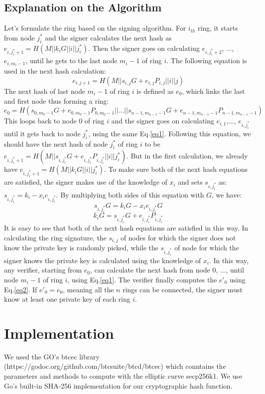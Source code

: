 \documentclass{llncs}
\begin{document}
\subsection{Explanation on the Algorithm}
Let's formulate the ring based on the signing algorithm. For $i_{th}$ ring, it starts from node $j^*_i$ and the signer calculates the next hash as $e_{i,j^*_i+1}=H(M||k_iG||i||j^*_i)$. Then the signer goes on calculating $e_{i,j^*_i+2}$, ..., $e_{i,m_i-1}$,  until he gets to the last node $m_i-1$ of ring $i$. The following equation is used in the next hash calculation:
\begin{equation}
\label{eq1}
e_{i,j+1}=H(M||s_{i,j}G+e_{i,j}P_{i,j}||i||j) 
\end{equation}
The next hash of last node $m_i-1$ of ring $i$ is defined as $e_0$, which links the last and first node thus forming a ring:
\begin{equation}
\label{eq2}
e_0=H(s_{0,m_0-1}G+e_{0,m_0-1}P_{0,m_0-1}||...||s_{n-1,m_{n-1}-1}G+e_{n-1,m_{n-1}-1}P_{n-1,m_{n-1}-1})
\end{equation}
This loops back to node $0$ of ring $i$ and the signer goes on calculating $e_{i,1}$,..., $e_{i,j^*_i}$ until it gets back to node $j^*_i$, using the same Eq.\ref{eq1}. Following this equation, we should have the next hash of node $j^*_i$ of ring $i$ to be $e_{i,j^*_i+1}=H(M||s_{i,j^*_i}G+e_{i,j^*_i}P_{i,j^*_i}||i||j^*_i)$. But in the first calculation, we already have  $e_{i,j^*_i+1}=H(M||k_iG||i||j^*_i)$. To make sure both of the next hash equations are satisfied, the signer makes use of the knowledge of $x_i$ and sets $s_{i,j^*_i}$ as: $s_{i,j^*_i}=k_i-x_ie_{i,j^*_i}$. By multiplying both sides of this equation with $G$, we have:
\begin{equation}
\label{eq3}
s_{i,j^*_i}G=k_iG-x_ie_{i,j^*_i}G 
\end{equation}
\begin{equation}
\label{eq4}
k_iG=s_{i,j^*_i}G+e_{i,j^*_i}P_{i,j^*_i}
\end{equation}
It is easy to see that both of the next hash equations are satisfied in this way. In calculating the ring signature, the $s_{i,j}$ of nodes for which the signer does not know the private key is randomly picked, while the $s_{i,j^*_i}$ of node for which the signer knows the private key is calculated using the knowledge of $x_i$. In this way, any verifier, starting from $e_0$, can calculate the next hash from node $0$, ..., until node $m_i-1$ of ring $i$, using Eq.\ref{eq1}. The verifier finally computes the $e'_0$ using Eq.\ref{eq2}. If $e'_0=e_0$, meaning all the $n$ rings can be connected, the signer must know at least one private key of each ring $i$.

\section{Implementation}
We used the GO's btcec library (https://godoc.org/github.com/btcsuite/btcd/btcec) which conntains the parameters and methods to compute with the elliptic curve secp256k1. We use Go’s built-in SHA-256 implementation for our cryptographic hash function.
\end{document}

